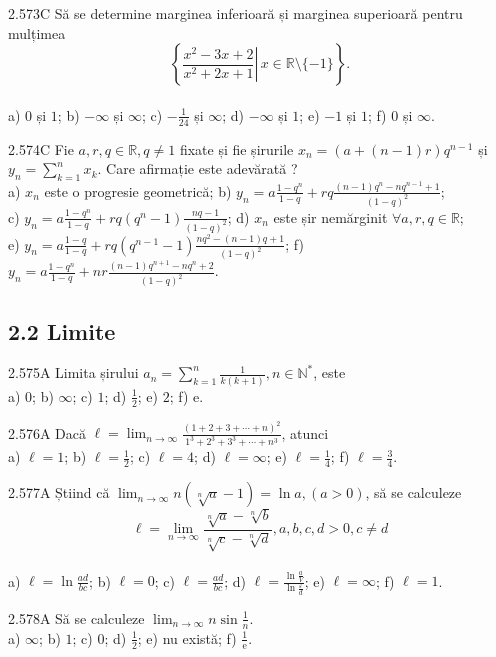 \documentclass[11pt]{article}
\begin{document}
2.573C Să se determine marginea inferioară și marginea superioară pentru mulțimea $$\left\{\left.\frac{x^{2}-3 x+2}{x^{2}+2 x+1} \right\rvert\, x \in \mathbb{R} \setminus\{-1\}\right\}.$$\\ a) $0$ și $1$; b) $-\infty$ și $\infty$; c) $-\frac{1}{24}$ și $\infty$; d) $-\infty$ și $1$; e) $-1$ și $1$; f) $0$ și $\infty$.

2.574C Fie $a, r, q \in \mathbb{R}, q \neq 1$ fixate și fie șirurile $x_{n}=(a+(n-1) r) q^{n-1}$ și $y_{n}=\sum_{k=1}^{n} x_{k}$. Care afirmație este adevărată ?\\ a) $x_{n}$ este o progresie geometrică; b) $y_{n}=a \frac{1-q^{n}}{1-q}+r q \frac{(n-1) q^{n}-n q^{n-1}+1}{(1-q)^{2}}$;\\ c) $y_{n}=a \frac{1-q^{n}}{1-q}+r q\left(q^{n}-1\right) \frac{n q-1}{(1-q)^{2}}$; d) $x_{n}$ este șir nemărginit $\forall a, r, q \in \mathbb{R}$;\\ e) $y_{n}=a \frac{1-q}{1-q}+r q\left(q^{n-1}-1\right) \frac{n q^{2}-(n-1) q+1}{(1-q)^{2}}$; f) $y_{n}=a \frac{1-q^{n}}{1-q}+n r \frac{(n-1) q^{n+1}-n q^{n}+2}{(1-q)^{2}}$.

\subsection*{2.2 Limite}
2.575A Limita șirului $a_{n}=\sum_{k=1}^{n} \frac{1}{k(k+1)}, n \in \mathbb{N}^{*}$, este\\ a) $0$; b) $\infty$; c) $1$; d) $\frac{1}{2}$; e) $2$; f) $\mathrm{e}$.

2.576A Dacă $\ell=\lim _{n \rightarrow \infty} \frac{(1+2+3+\cdots+n)^{2}}{1^{3}+2^{3}+3^{3}+\cdots+n^{3}}$, atunci\\ a) $\ell=1$; b) $\ell=\frac{1}{2}$; c) $\ell=4$; d) $\ell=\infty$; e) $\ell=\frac{1}{4}$; f) $\ell=\frac{3}{4}$.

2.577A Știind că $\lim _{n \rightarrow \infty} n(\sqrt[n]{a}-1)=\ln a,(a>0)$, să se calculeze $$\ell=\lim _{n \rightarrow \infty} \frac{\sqrt[n]{a}-\sqrt[n]{b}}{\sqrt[n]{c}-\sqrt[n]{d}}, a, b, c, d>0, c \neq d$$\\ a) $\ell=\ln \frac{a d}{b c}$; b) $\ell=0$; c) $\ell=\frac{a d}{b c}$; d) $\ell=\frac{\ln \frac{a}{V}}{\ln \frac{\varepsilon}{d}}$; e) $\ell=\infty$; f) $\ell=1$.

2.578A Să se calculeze $\lim _{n \rightarrow \infty} n \sin \frac{1}{n}$.\\ a) $\infty$; b) $1$; c) $0$; d) $\frac{1}{2}$; e) nu există; f) $\frac{1}{\mathrm{e}}$.
\end{document}
